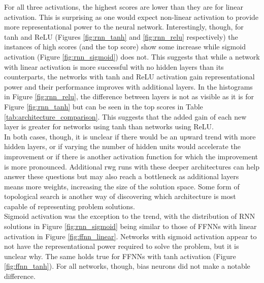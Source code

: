 \documentclass[12pt]{article}
\begin{document}
For all three activations, the highest scores are lower than they are for linear activation. 
This is surprising as one would expect non-linear activation to provide more representational power to the neural network. 
Interestingly, though, for tanh and ReLU (Figures \ref{fig:rnn_tanh} and \ref{fig:rnn_relu} respectively) the instances of high scores (and the top score) show some increase while sigmoid activation (Figure \ref{fig:rnn_sigmoid}) does not. 
This suggests that while a network with linear activation is more successful with no hidden layers than its counterparts, the networks with tanh and ReLU activation gain representational power and their performance improves with additional layers. 
In the histograms in Figure \ref{fig:rnn_relu}, the difference between layers is not as visible as it is for Figure \ref{fig:rnn_tanh} but can be seen in the top scores in Table \ref{tab:architecture_comparison}. 
This suggests that the added gain of each new layer is greater for networks using tanh than networks using ReLU.\\

In both cases, though, it is unclear if there would be an upward trend with more hidden layers, or if varying the number of hidden units would accelerate the improvement or if there is another activation function for which the improvement is more pronounced. 
Additional rwg runs with these deeper architectures can help answer these questions but may also reach a bottleneck as additional layers means more weights, increasing the size of the solution space. 
Some form of topological search \cite{stanley:MIT:2002} is another way of discovering which architecture is most capable of representing problem solutions.\\ 

Sigmoid activation was the exception to the trend, with the distribution of RNN solutions in Figure \ref{fig:rnn_sigmoid} being similar to those of FFNNs with linear activation in Figure \ref{fig:ffnn_linear}. 
Networks with sigmoid activation appear to not have the representational power required to solve the problem, but it is unclear why. 
The same holds true for FFNNs with tanh activation (Figure \ref{fig:ffnn_tanh}). 
For all networks, though, bias neurons did not make a notable difference.\\
\end{document}
